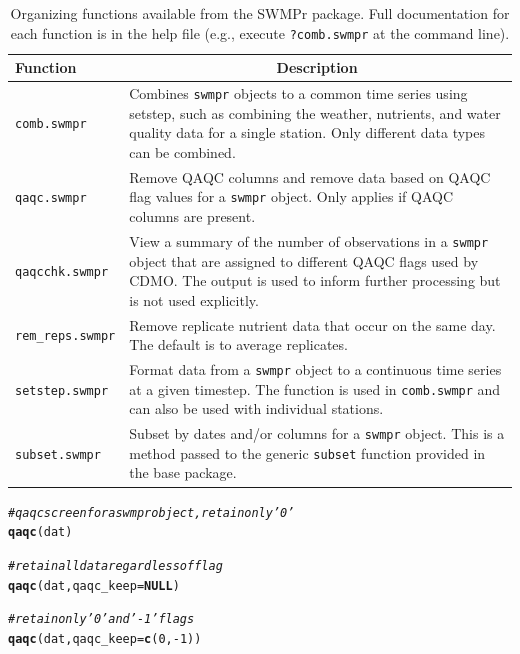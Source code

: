 \documentclass[10pt,letterpaper]{article}\usepackage[]{graphicx}\usepackage[]{color}
\makeatletter
\newcommand{\hlnum}[1]{\textcolor[rgb]{0.686,0.059,0.569}{#1}}%
\newcommand{\hlcom}[1]{\textcolor[rgb]{0.678,0.584,0.686}{\textit{#1}}}%
\newcommand{\hlopt}[1]{\textcolor[rgb]{0,0,0}{#1}}%
\newcommand{\hlstd}[1]{\textcolor[rgb]{0.345,0.345,0.345}{#1}}%
\newcommand{\hlkwa}[1]{\textcolor[rgb]{0.161,0.373,0.58}{\textbf{#1}}}%
\newcommand{\hlkwc}[1]{\textcolor[rgb]{0.333,0.667,0.333}{#1}}%
\newcommand{\hlkwd}[1]{\textcolor[rgb]{0.737,0.353,0.396}{\textbf{#1}}}%
\newenvironment{kframe}{%
 \def\at@end@of@kframe{}%
 \ifinner\ifhmode%
  \def\at@end@of@kframe{\end{minipage}}%
  \begin{minipage}{\columnwidth}%
 \fi\fi%
 \def\FrameCommand##1{\hskip\@totalleftmargin \hskip-\fboxsep
 \colorbox{shadecolor}{##1}\hskip-\fboxsep
     \hskip-\linewidth \hskip-\@totalleftmargin \hskip\columnwidth}%
 \MakeFramed {\advance\hsize-\width
   \@totalleftmargin\z@ \linewidth\hsize
   \@setminipage}}%
 {\par\unskip\endMakeFramed%
 \at@end@of@kframe}
\newenvironment{knitrout}{}{} %
\makeatother
\begin{document}
\begin{table}[!tbp]
\caption{Organizing functions available from the SWMPr package. Full documentation for each function is in the help file (e.g., execute \texttt{?comb.swmpr} at the command line).\label{tab:organize}} 
\begin{center}
\begin{tabular}{lp{3.5in}}
\hline\hline
\multicolumn{1}{l}{Function}&\multicolumn{1}{c}{Description}\tabularnewline
\hline
\texttt{comb.swmpr}&Combines \texttt{swmpr} objects to a common time series using setstep, such as combining the weather, nutrients, and water quality data for a single station. Only different data types can be combined.\tabularnewline
\texttt{qaqc.swmpr}&Remove \ac{QAQC} columns and remove data based on \ac{QAQC} flag values for a \texttt{swmpr} object.  Only applies if \ac{QAQC} columns are present. \tabularnewline
\texttt{qaqcchk.swmpr}&View a summary of the number of observations in a \texttt{swmpr} object that are assigned to different \ac{QAQC} flags used by \ac{CDMO}.  The output is used to inform further processing but is not used explicitly.\tabularnewline
\texttt{rem\_reps.swmpr}&Remove replicate nutrient data that occur on the same day.  The default is to average replicates.\tabularnewline
\texttt{setstep.swmpr}&Format data from a \texttt{swmpr} object to a continuous time series at a given timestep.  The function is used in \texttt{comb.swmpr} and can also be used with individual stations.\tabularnewline
\texttt{subset.swmpr}&Subset by dates and/or columns for a \texttt{swmpr} object.  This is a method passed to the generic \texttt{subset} function provided in the base package.\tabularnewline
\hline
\end{tabular}\end{center}

\end{table}


\begin{knitrout}
\color{fgcolor}\begin{kframe}
\begin{alltt}
\hlcom{# qaqc screen for a swmpr object, retain only '0'}
\hlkwd{qaqc}\hlstd{(dat)}

\hlcom{# retain all data regardless of flag}
\hlkwd{qaqc}\hlstd{(dat,} \hlkwc{qaqc_keep} \hlstd{=} \hlkwa{NULL}\hlstd{)}

\hlcom{# retain only '0' and '-1' flags}
\hlkwd{qaqc}\hlstd{(dat,} \hlkwc{qaqc_keep} \hlstd{=} \hlkwd{c}\hlstd{(}\hlnum{0}\hlstd{,} \hlopt{-}\hlnum{1}\hlstd{))}
\end{alltt}
\end{kframe}
\end{knitrout}
\end{document}

